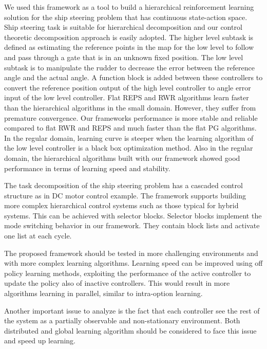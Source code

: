 We used this framework as a tool to build a hierarchical reinforcement learning solution for the ship steering problem that has continuous state-action space. Ship steering task is suitable for hierarchical decomposition and our control theoretic decomposition approach is easily adopted. The higher level subtask is defined as estimating the reference points in the map for the low level to follow and pass through a gate that is in an unknown fixed position. The low level subtask is to manipulate the rudder to decrease the error between the reference angle and the actual angle. A function block is added between these controllers to convert the reference position output of the high level controller to angle error input of the low level controller. Flat REPS and RWR algorithms learn faster than the hierarchical algorithms in the small domain. However, they suffer from premature convergence. Our frameworks performance is more stable and reliable compared to flat RWR and REPS and much faster than the flat PG algorithms. In the regular domain, learning curve is steeper when the learning algorithm of the low level controller is a black box optimization method. Also in the regular domain, the hierarchical algorithms built with our framework showed good performance in terms of learning speed and stability.

The task decomposition of the ship steering problem has a cascaded control structure as in DC motor control example. The framework supports building more complex hierarchical control systems such as those typical for hybrid systems. This can be achieved with selector blocks. Selector blocks implement the mode switching behavior in our framework. They contain block lists and activate one list at each cycle. 

The proposed framework should be tested in more challenging environments and with more complex learning algorithms. Learning speed can be improved using off policy learning methods, exploiting the performance of the active controller to update the policy also of inactive controllers. This would result in more algorithms learning in parallel, similar to intra-option learning.

Another important issue to analyze is the fact that each controller see the rest of the system as a partially observable and non-stationary environment. Both distributed and global learning algorithm should be considered to face this issue and speed up learning. 

